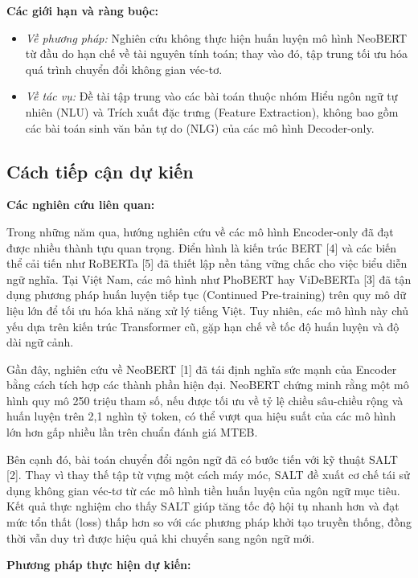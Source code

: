 \documentclass{article}[14pt]
\begin{document}
{    \textbf{Các giới hạn và ràng buộc:}
    \begin{itemize}
        \item \textit{Về phương pháp:} Nghiên cứu không thực hiện huấn luyện mô hình NeoBERT từ đầu do hạn chế về tài nguyên tính toán; thay vào đó, tập trung tối ưu hóa quá trình chuyển đổi không gian véc-tơ.
        \item \textit{Về tác vụ:} Đề tài tập trung vào các bài toán thuộc nhóm Hiểu ngôn ngữ tự nhiên (NLU) và Trích xuất đặc trưng (Feature Extraction), không bao gồm các bài toán sinh văn bản tự do (NLG) của các mô hình Decoder-only.
    \end{itemize}
    
    \subsection{Cách tiếp cận dự kiến}
    
    \textbf{Các nghiên cứu liên quan:}
        
    Trong những năm qua, hướng nghiên cứu về các mô hình Encoder-only đã đạt được nhiều thành tựu quan trọng. Điển hình là kiến trúc BERT [4] và các biến thể cải tiến như RoBERTa [5] đã thiết lập nền tảng vững chắc cho việc biểu diễn ngữ nghĩa. Tại Việt Nam, các mô hình như PhoBERT hay ViDeBERTa [3] đã tận dụng phương pháp huấn luyện tiếp tục (Continued Pre-training) trên quy mô dữ liệu lớn để tối ưu hóa khả năng xử lý tiếng Việt. Tuy nhiên, các mô hình này chủ yếu dựa trên kiến trúc Transformer cũ, gặp hạn chế về tốc độ huấn luyện và độ dài ngữ cảnh.
    
    Gần đây, nghiên cứu về NeoBERT [1] đã tái định nghĩa sức mạnh của Encoder bằng cách tích hợp các thành phần hiện đại. NeoBERT chứng minh rằng một mô hình quy mô 250 triệu tham số, nếu được tối ưu về tỷ lệ chiều sâu-chiều rộng và huấn luyện trên 2,1 nghìn tỷ token, có thể vượt qua hiệu suất của các mô hình lớn hơn gấp nhiều lần trên chuẩn đánh giá MTEB.
    
    Bên cạnh đó, bài toán chuyển đổi ngôn ngữ đã có bước tiến với kỹ thuật SALT [2]. Thay vì thay thế tập từ vựng một cách máy móc, SALT đề xuất cơ chế tái sử dụng không gian véc-tơ từ các mô hình tiền huấn luyện của ngôn ngữ mục tiêu. Kết quả thực nghiệm cho thấy SALT giúp tăng tốc độ hội tụ nhanh hơn và đạt mức tổn thất (loss) thấp hơn so với các phương pháp khởi tạo truyền thống, đồng thời vẫn duy trì được hiệu quả khi chuyển sang ngôn ngữ mới.
    
    \textbf{Phương pháp thực hiện dự kiến:}
    
}
\end{document}
